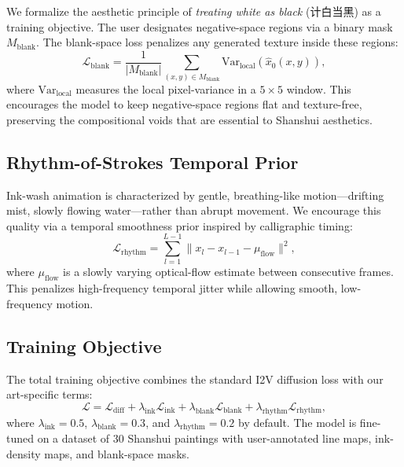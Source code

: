 We formalize the aesthetic principle of \emph{treating white as
black} (计白当黑) as a training objective. The user designates
negative-space regions via a binary mask $M_{\text{blank}}$. The
blank-space loss penalizes any generated texture inside these
regions:
\begin{equation}
\mathcal{L}_{\text{blank}} = \frac{1}{|M_{\text{blank}}|}
\sum_{(x,y) \in M_{\text{blank}}} \text{Var}_{\text{local}}(\hat{x}_0(x,y)),
\end{equation}
where $\text{Var}_{\text{local}}$ measures the local pixel-variance
in a $5 \times 5$ window. This encourages the model to keep
negative-space regions flat and texture-free, preserving the
compositional voids that are essential to Shanshui aesthetics.

\subsection{Rhythm-of-Strokes Temporal Prior}
\label{sec:rhythm}

Ink-wash animation is characterized by gentle, breathing-like
motion---drifting mist, slowly flowing water---rather than abrupt
movement. We encourage this quality via a temporal smoothness
prior inspired by calligraphic timing:
\begin{equation}
\mathcal{L}_{\text{rhythm}} = \sum_{l=1}^{L-1}
\| x_l - x_{l-1} - \mu_{\text{flow}} \|^2,
\end{equation}
where $\mu_{\text{flow}}$ is a slowly varying optical-flow
estimate between consecutive frames. This penalizes high-frequency
temporal jitter while allowing smooth, low-frequency motion.

\subsection{Training Objective}

The total training objective combines the standard I2V diffusion
loss with our art-specific terms:
\begin{equation}
\mathcal{L} = \mathcal{L}_{\text{diff}} + \lambda_{\text{ink}}
\mathcal{L}_{\text{ink}} + \lambda_{\text{blank}}
\mathcal{L}_{\text{blank}} + \lambda_{\text{rhythm}}
\mathcal{L}_{\text{rhythm}},
\end{equation}
where $\lambda_{\text{ink}} = 0.5$, $\lambda_{\text{blank}} = 0.3$,
and $\lambda_{\text{rhythm}} = 0.2$ by default. The model is
fine-tuned on a dataset of 30 Shanshui paintings with
user-annotated line maps, ink-density maps, and blank-space masks.


